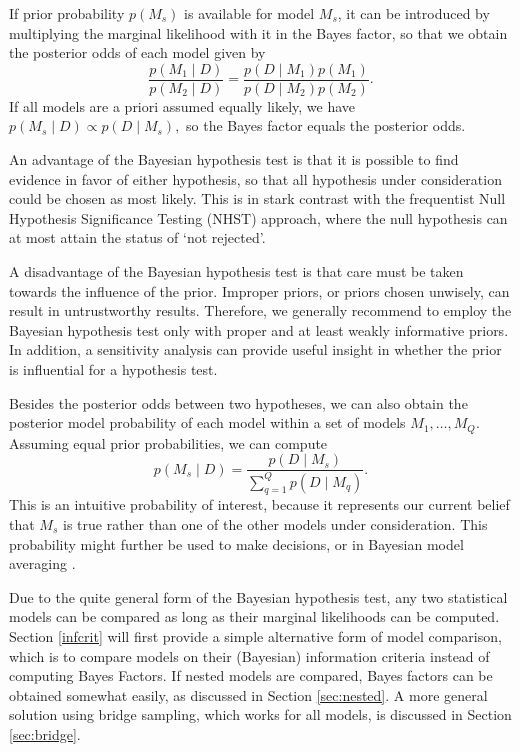 If prior probability \(p(M_s)\) is available for model \(M_s\), it can
be introduced by multiplying the marginal likelihood with it in the
Bayes factor, so that we obtain the posterior odds of each model given
by \begin{equation}
\frac{p( M_1 \mid D)}{p( M_2 \mid D)} = \frac{p(D \mid M_1) p(M_1)}{p(D \mid M_2) p(M_2)}.
\end{equation} If all models are a priori assumed equally likely, we
have \(p(M_s \mid D) \propto p(D\mid M_s),\) so the Bayes factor equals
the posterior odds.

An advantage of the Bayesian hypothesis test is that it is possible to
find evidence in favor of either hypothesis, so that all hypothesis
under consideration could be chosen as most likely. This is in stark
contrast with the frequentist Null Hypothesis Significance Testing
(NHST) approach, where the null hypothesis can at most attain the status
of `not rejected'.

A disadvantage of the Bayesian hypothesis test is that care must be
taken towards the influence of the prior. Improper priors, or priors
chosen unwisely, can result in untrustworthy results. Therefore, we
generally recommend to employ the Bayesian hypothesis test only with
proper and at least weakly informative priors. In addition, a
sensitivity analysis can provide useful insight in whether the prior is
influential for a hypothesis test.

Besides the posterior odds between two hypotheses, we can also obtain
the posterior model probability of each model within a set of models
\(M_1, \dots, M_Q\). Assuming equal prior probabilities, we can compute
\begin{equation}
p(M_s \mid D) = \frac{p(D \mid M_s)}{\sum_{q = 1}^Q p(D \mid M_q)}.
\end{equation} This is an intuitive probability of interest, because it
represents our current belief that \(M_s\) is true rather than one of
the other models under consideration. This probability might further be
used to make decisions, or in Bayesian model averaging
\citep{hoeting1999bayesian, bao2010bias}.

Due to the quite general form of the Bayesian hypothesis test, any two
statistical models can be compared as long as their marginal likelihoods
can be computed. Section \ref{infcrit} will first provide a simple
alternative form of model comparison, which is to compare models on
their (Bayesian) information criteria \citep[Ch. 7]{gelman2003bayesian}
instead of computing Bayes Factors. If nested models are compared, Bayes
factors can be obtained somewhat easily, as discussed in Section
\ref{sec:nested}. A more general solution using bridge sampling, which
works for all models, is discussed in Section \ref{sec:bridge}.

